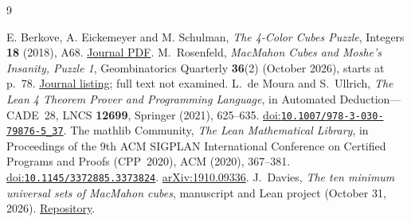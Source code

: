 \documentclass[11pt]{article}
\theoremstyle{remark}
\begin{document}
\begin{thebibliography}{9}
\raggedright
{}
E. Berkove, A. Eickemeyer and M. Schulman,
\emph{The 4-Color Cubes Puzzle}, Integers \textbf{18} (2018), A68.
\href{https://math.colgate.edu/~integers/s68/s68.pdf}{Journal PDF}.
 M.~Rosenfeld,
\emph{MacMahon Cubes and Moshe's Insanity, Puzzle 1},
Geombinatorics Quarterly \textbf{36}(2) (October 2026), starts at p.~78.
\href{https://geombina.uccs.edu/past-issues/volume-xxxvi}{Journal listing};
full text not examined.
 L.~de Moura and S.~Ullrich,
\emph{The Lean 4 Theorem Prover and Programming Language},
in Automated Deduction---CADE~28, LNCS \textbf{12699}, Springer (2021),
625--635.
\href{https://doi.org/10.1007/978-3-030-79876-5_37}{doi:\nolinkurl{10.1007/978-3-030-79876-5_37}}.
 The mathlib Community,
\emph{The Lean Mathematical Library},
in Proceedings of the 9th ACM SIGPLAN International Conference on
Certified Programs and Proofs (CPP~2020), ACM (2020), 367--381.
\href{https://doi.org/10.1145/3372885.3373824}{doi:\nolinkurl{10.1145/3372885.3373824}}.
\href{https://arxiv.org/abs/1910.09336}{arXiv:1910.09336}.
 J.~Davies,
\emph{The ten minimum universal sets of MacMahon cubes}, manuscript and
Lean project (October 31, 2026).
\href{https://github.com/jasondavies/macmahon-min-universal-sets}{Repository}.
\end{thebibliography}
\end{document}
